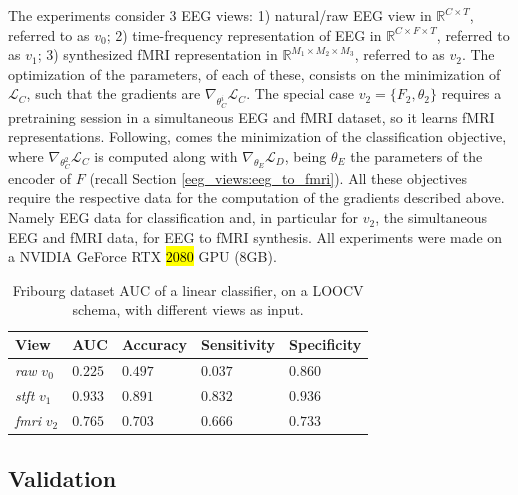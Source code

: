\documentclass{article}
\begin{document}
The experiments consider 3 EEG views: 1) natural/raw EEG view in $\mathbb{R}^{C \times T}$, referred to as $v_0$; 2) time-frequency representation of EEG in $\mathbb{R}^{C \times F \times T}$, referred to as $v_1$; 3) synthesized fMRI representation in $\mathbb{R}^{M_1 \times M_2 \times M_3}$, referred to as $v_2$. The optimization of the parameters, of each of these, consists on the minimization of $\mathcal{L}_C$, such that the gradients are $\nabla_{\theta_C^i} \mathcal{L}_C$. The special case $v_2=\{F_2, \theta_2\}$ requires a pretraining session in a simultaneous EEG and fMRI dataset, so it learns fMRI representations. Following, comes the minimization of the classification objective, where $\nabla_{\theta_C^2} \mathcal{L}_C$ is computed along with $\nabla_{\theta_E} \mathcal{L}_D$, being $\theta_E$ the parameters of the encoder of $F$ (recall Section \ref{eeg_views:eeg_to_fmri}). All these objectives require the respective data for the computation of the gradients described above. Namely EEG data for classification and, in particular for $v_2$, the simultaneous EEG and fMRI data, for EEG to fMRI synthesis. All experiments were made on a NVIDIA GeForce RTX \hl{2080} GPU (8GB).

\begin{table}[t]
    \centering
    \caption{Fribourg dataset AUC of a linear classifier, on a LOOCV schema, with different views as input.}
    \begin{tabular}{ p{2cm} | p{} | p{} | p{} | p{}}
        \hline
        \hline
        \hfil View & \hfil AUC & \hfil Accuracy & \hfil Sensitivity & \hfil Specificity \\
        \hline
            \hfil \textit{raw} $v_0$ & \hfil $0.225$ & \hfil $0.497$ & \hfil $0.037$ & \hfil $0.860$\\
            \hfil \textit{stft} $v_1$ & \hfil $\mathbf{0.933}$ & \hfil $\mathbf{0.891}$ & \hfil $\mathbf{0.832}$ & \hfil $\mathbf{0.936}$\\
            \hfil \textit{fmri} $v_2$ & \hfil $0.765$ & \hfil $0.703$ & \hfil $0.666$ & \hfil $0.733$\\
        \hline
        \hline
    \end{tabular}
    
    \label{tab:auc_schizophrenia}
\end{table}


\subsection{Validation}\label{section:validation}
\end{document}
